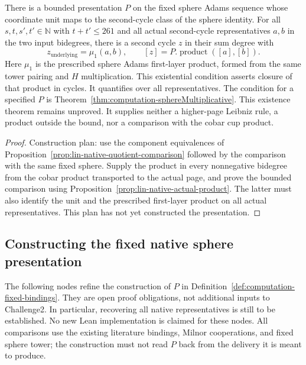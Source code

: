 \begin{theorem}
  \label{thm:bounded-sphere-multiplication}
  \notready
  There is a bounded presentation $P$ on the fixed sphere Adams
  sequence whose coordinate unit maps to the second-cycle class of the
  sphere identity. For all $s,t,s',t'\in\mathbb N$ with
  $t+t'\le261$ and all actual second-cycle representatives $a,b$ in
  the two input bidegrees, there is a second cycle $z$ in their sum degree
  with
  \[
    z_{\mathrm{underlying}}=\mu_1(a,b),\qquad
    [z]=P.\operatorname{product}([a],[b]).
  \]
  Here $\mu_1$ is the prescribed sphere Adams first-layer product,
  formed from the same tower pairing and $H$ multiplication.
  This existential condition asserts closure of that product in cycles.
  It quantifies over all representatives. The condition for a specified
  $P$ is Theorem~\ref{thm:computation-sphereMultiplicative}.
  This existence theorem remains unproved. It supplies neither a
  higher-page Leibniz rule, a product outside the bound, nor a comparison
  with the cobar cup product.
\end{theorem}

\begin{proof}
  \notready
  Construction plan: use the component equivalences of
  Proposition~\ref{prop:lin-native-quotient-comparison} followed by the
  comparison with the same fixed sphere. Supply the product in every
  nonnegative bidegree from the cobar product transported to the actual
  page, and prove the bounded comparison using
  Proposition~\ref{prop:lin-native-actual-product}. The latter must also
  identify the unit and the prescribed first-layer product on all actual
  representatives. This plan has not yet constructed the presentation.
\end{proof}

\subsection{Constructing the fixed native sphere presentation}
\label{sec:lin-native-presentation-construction}

The following nodes refine the construction of $P$ in
Definition~\ref{def:computation-fixed-bindings}. They are open proof
obligations, not additional inputs to Challenge2. In particular, recovering
all native representatives is still to be established. No new Lean
implementation is claimed for these nodes. All comparisons use the existing
literature bindings, Milnor cooperations, and fixed sphere tower; the
construction must not read $P$ back from the delivery it is meant to produce.

